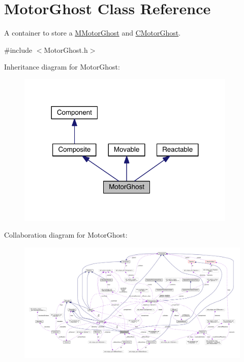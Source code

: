 \hypertarget{classMotorGhost}{\section{Motor\+Ghost Class Reference}
\label{classMotorGhost}
}


A container to store a \hyperlink{classMMotorGhost}{M\+Motor\+Ghost} and \hyperlink{classCMotorGhost}{C\+Motor\+Ghost}.  




{\ttfamily \#include $<$Motor\+Ghost.\+h$>$}



Inheritance diagram for Motor\+Ghost\+:\nopagebreak
\begin{figure}[H]
\begin{center}
\leavevmode
\includegraphics[width=296pt]{classMotorGhost__inherit__graph}
\end{center}
\end{figure}


Collaboration diagram for Motor\+Ghost\+:\nopagebreak
\begin{figure}[H]
\begin{center}
\leavevmode
\includegraphics[width=350pt]{classMotorGhost__coll__graph}
\end{center}
\end{figure}

